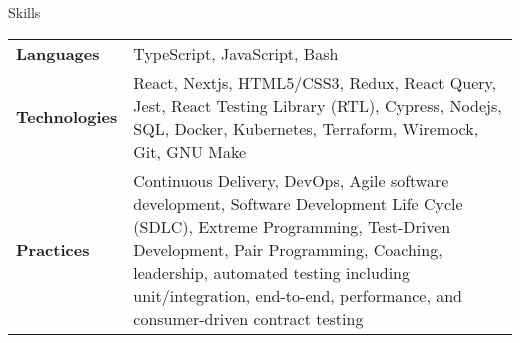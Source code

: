 \begin{section}{Skills}
  \begin{tabularx}{\linewidth}{@{}l X@{}}
    \textbf{Languages} &\small{TypeScript, JavaScript, Bash} \\
    \textbf{Technologies} &\small{React, Nextjs, HTML5/CSS3, Redux, React Query, Jest, React Testing Library (RTL), Cypress, Nodejs, SQL, Docker, Kubernetes, Terraform, Wiremock, Git, GNU Make} \\
    \textbf{Practices} &\small{Continuous Delivery, DevOps, Agile software development, Software Development Life Cycle (SDLC), Extreme Programming, Test-Driven Development, Pair Programming, Coaching, leadership, automated testing including unit/integration, end-to-end, performance, and consumer-driven contract testing} \\
  \end{tabularx}
\end{section}
